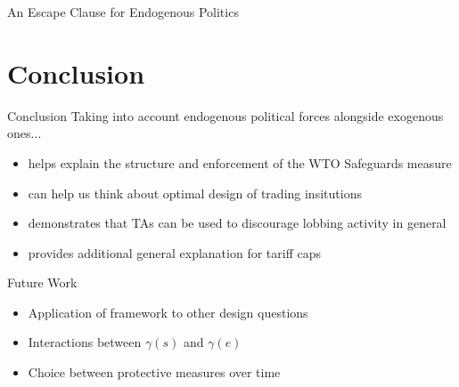 \documentclass[handout]{beamer}
\newcommand{\ga}{\gamma}
\begin{document}
{\begin{frame}{An Escape Clause for Endogenous Politics}
\end{frame}






\section{Conclusion}

\begin{frame}{Conclusion}
Taking into account endogenous political forces alongside exogenous ones...
\pause
\begin{itemize}[<+->]
		\item helps explain the structure and enforcement of the WTO Safeguards measure
		\item can help us think about optimal design of trading insitutions
		\item demonstrates that TAs can be used to discourage lobbing activity in general
		\item provides additional general explanation for tariff caps
\end{itemize}

\end{frame}

\begin{frame}{Future Work}
\pause
\begin{itemize}[<+->]
	\item Application of framework to other design questions
	\item Interactions between $\ga(s)$ and $\ga(e)$
	\item Choice between protective measures over time
\end{itemize}


\end{frame}}
\end{document}
